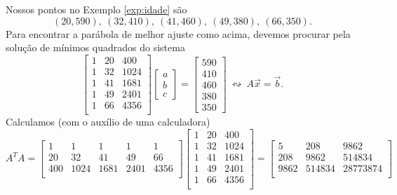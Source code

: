 \begin{ex}
  Nossos pontos no Exemplo \ref{exp:idade} são
  \begin{equation}
  (20, 590), \ (32, 410), \ (41, 460), \ (49, 380), \ (66, 350).
  \end{equation} Para encontrar a parábola de melhor ajuste como acima, devemos procurar pela solução de mínimos quadrados do sistema
  \begin{equation}
  \begin{bmatrix}
    1 & 20 & 400 \\
    1 & 32 & 1024 \\
    1 & 41 & 1681 \\
    1 & 49 & 2401 \\
    1 & 66 & 4356 \\
  \end{bmatrix}
  \begin{bmatrix}
    a \\ b \\ c
  \end{bmatrix} =
  \begin{bmatrix}
    590 \\ 410 \\ 460 \\ 380 \\ 350
  \end{bmatrix} \ \leftrightsquigarrow \ A \vec{x} = \vec{b}.
  \end{equation} Calculamos (com o auxílio de uma calculadora)
  \begin{equation}
  A^T A =
  \begin{bmatrix}
    1 & 1 & 1 & 1 & 1 \\
    20 & 32 & 41 & 49 & 66 \\
    400 & 1024 & 1681 & 2401 & 4356 \\
  \end{bmatrix}
  \begin{bmatrix}
    1 & 20 & 400 \\
    1 & 32 & 1024 \\
    1 & 41 & 1681 \\
    1 & 49 & 2401 \\
    1 & 66 & 4356 \\
  \end{bmatrix} =
  \begin{bmatrix}
    5 & 208 & 9862 \\
    208 & 9862 & 514834 \\
    9862 & 514834 & 28773874 \\

\end{bmatrix}
\end{equation}
\end{ex}
